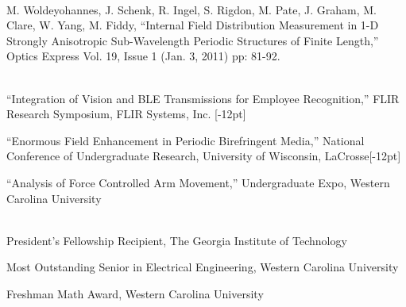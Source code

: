 \documentclass[14pt,letterpaper]{extarticle}
\begin{document}
\pagebreak
{}\vspace{5.3pt}\\
\noindent
\footnotesize{M. Woldeyohannes, J. Schenk, R. Ingel, S. Rigdon, M. Pate, J. Graham, M. Clare, W. Yang, M. Fiddy, ``Internal Field Distribution Measurement in 1-D Strongly Anisotropic Sub-Wavelength Periodic Structures of Finite Length,'' Optics Express Vol. 19, Issue 1 (Jan. 3, 2011) pp: 81-92.}

\vspace{5.3pt}\\
\footnotesize{``Integration of Vision and BLE Transmissions for Employee Recognition,'' FLIR Research Symposium, FLIR Systems, Inc.}
[-12pt]

\medskip\noindent
\footnotesize{``Enormous  Field  Enhancement  in  Periodic  Birefringent Media,''
National Conference of Undergraduate Research, University of Wisconsin, LaCrosse}[-12pt]

\medskip\noindent
\footnotesize{``Analysis of Force Controlled Arm Movement,'' Undergraduate Expo, Western Carolina University}

\vspace{5.3pt}\\
\noindent\footnotesize{President's Fellowship Recipient, The Georgia Institute of Technology}

\medskip
\noindent\footnotesize{Most Outstanding Senior in Electrical Engineering, Western Carolina University}

\medskip
\noindent\footnotesize{Freshman Math Award, Western Carolina University}
\end{document}
